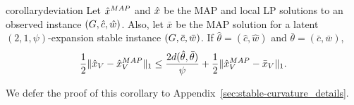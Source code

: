 \begin{restatable}{corollary}{deviation}\label{cor:deviation}
Let $\hat{x}^{MAP}$ and $\hat{x}$ be the MAP and local LP solutions to an observed instance $(G,\hat{c},\hat{w})$. Also, let $\bar{x}$ be the MAP solution for a latent $(2,1,\psi)$-expansion stable instance $(G,\bar{c},\bar{w})$. If $\hat{\theta} = (\hat{c},\hat{w})$ and $\bar{\theta} = (\bar{c}, \bar{w})$, \[ \frac{1}{2}\lVert \hat{x}_V - \hat{x}^{MAP}_V \rVert_1 \le \frac{2d(\hat{\theta}, \bar{\theta})}{\psi} + \frac{1}{2}\lVert \hat{x}_V^{MAP} - \bar{x}_V \rVert_1. \]
\end{restatable}

We defer the proof of this corollary to Appendix~\ref{sec:stable-curvature_details}.
